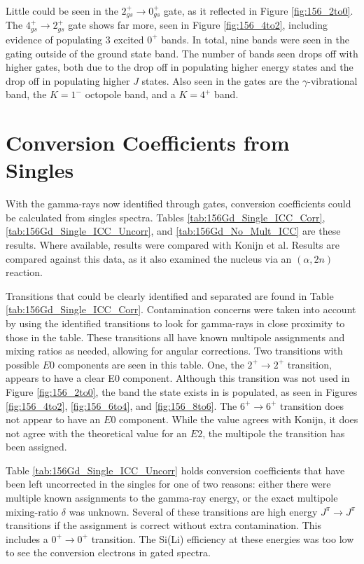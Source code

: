 Little could be seen in the $2_{gs}^+\rightarrow0_{gs}^+$ gate, as it reflected in Figure \ref{fig:156_2to0}. The $4_{gs}^+\rightarrow2_{gs}^+$ gate shows far more, seen in Figure \ref{fig:156_4to2}, including evidence of populating 3 excited $0^+$ bands. In total, nine bands were seen in the gating outside of the ground state band. The number of bands seen drops off with higher gates, both due to the drop off in populating higher energy states and the drop off in populating higher $J$ states. Also seen in the gates are the $\gamma$-vibrational band, the $K=1^-$ octopole band, and a $K=4^+$ band.

\section{Conversion Coefficients from Singles}

With the gamma-rays now identified through gates, conversion coefficients could be calculated from singles spectra. Tables \ref{tab:156Gd_Single_ICC_Corr}, \ref{tab:156Gd_Single_ICC_Uncorr}, and \ref{tab:156Gd_No_Mult_ICC} are these results. Where available, results were compared with Konijn et al\citep{konijn81:_156gd}. Results are compared against this data, as it also examined the nucleus via an $(\alpha,2n)$ reaction.

Transitions that could be clearly identified and separated are found in Table \ref{tab:156Gd_Single_ICC_Corr}. Contamination concerns were taken into account by using the identified transitions to look for gamma-rays in close proximity to those in the table. These transitions all have known multipole assignments and mixing ratios as needed, allowing for angular corrections. Two transitions with possible $E0$ components are seen in this table. One, the $2^+\rightarrow2^+$ transition, appears to have a clear E0 component. Although this transition was not used in Figure \ref{fig:156_2to0}, the band the state exists in is populated, as seen in Figures \ref{fig:156_4to2}, \ref{fig:156_6to4}, and \ref{fig:156_8to6}. The $6^+\rightarrow6^+$ transition does not appear to have an $E0$ component. While the value agrees with Konijn\citep{konijn81:_156gd}, it does not agree with the theoretical value for an $E2$, the multipole the transition has been assigned.

\afterpage{\clearpage}

Table \ref{tab:156Gd_Single_ICC_Uncorr} holds conversion coefficients that have been left uncorrected in the singles for one of two reasons: either there were multiple known assignments to the gamma-ray energy, or the exact multipole mixing-ratio $\delta$ was unknown. Several of these transitions are high energy $J^\pi\rightarrow J^\pi$ transitions if the assignment is correct without extra contamination. This includes a $0^+\rightarrow0^+$ transition. The Si(Li) efficiency at these energies was too low to see the conversion electrons in gated spectra.

